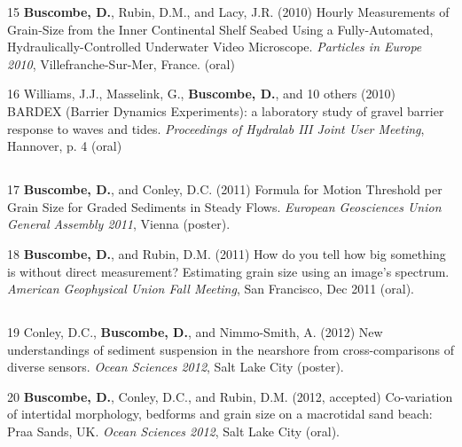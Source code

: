 \documentclass[margin,line]{resume}
\begin{document}
\begin{resume}
\begin{footnotesize}
\begin{list1}
	\item[15] {\bf Buscombe, D.}, Rubin, D.M., and Lacy, J.R. (2010) Hourly Measurements of Grain-Size from the Inner Continental Shelf Seabed Using a Fully-Automated, Hydraulically-Controlled Underwater Video Microscope. {\sl Particles in Europe 2010}, Villefranche-Sur-Mer, France. (oral)\\

	\item[16] Williams, J.J., Masselink, G., {\bf Buscombe, D.}, and 10 others (2010) BARDEX (Barrier Dynamics Experiments): a laboratory study of gravel barrier response to waves and tides. {\sl Proceedings of Hydralab III Joint User Meeting}, Hannover, p. 4 (oral)
	\end{list1}

	\subsection{}
	\begin{list1}
	\item[17] {\bf Buscombe, D.}, and Conley, D.C. (2011) Formula for Motion Threshold per Grain Size for Graded Sediments in Steady Flows. {\sl European Geosciences Union General Assembly 2011}, Vienna (poster).\\

        \item[18] {\bf Buscombe, D.}, and Rubin, D.M. (2011) How do you tell how big something is without direct measurement? Estimating grain size using an image’s spectrum. {\sl American Geophysical Union Fall Meeting}, San Francisco, Dec 2011 (oral).
	\end{list1}

	\subsection{}
	\begin{list1}
        \item[19] Conley, D.C., {\bf Buscombe, D.}, and Nimmo-Smith, A. (2012) New understandings of sediment suspension in the nearshore from cross-comparisons of diverse  sensors. {\sl Ocean Sciences 2012}, Salt Lake City (poster).\\

	\item[20] {\bf Buscombe, D.}, Conley, D.C., and Rubin, D.M. (2012, accepted) Co-variation of intertidal morphology, bedforms and grain size on a macrotidal sand beach: Praa Sands, UK. {\sl Ocean Sciences 2012}, Salt Lake City (oral).\\


\end{list1}
\end{footnotesize}
\end{resume}
\end{document}
